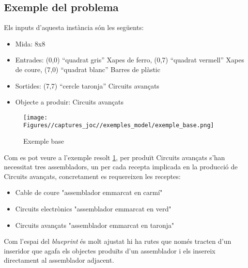 \subsection{Exemple del problema}
Els inputs d'aquesta instància són les següents:\\
\begin{itemize}
    \item Mida: 8x8
    \item Entrades: (0,0) ``quadrat gris'' Xapes de ferro, (0,7) ``quadrat vermell'' Xapes de coure, (7,0) ``quadrat blanc'' Barres de plàstic
    \item Sortides: (7,7) ``cercle taronja'' Circuits avançats
    \item Objecte a produir: Circuits avançats
\end{itemize}

\begin{figure}
    \centering
    \texttt{[image: Figures//captures\_joc//exemples\_model/exemple\_base.png]}
    \caption{Exemple base}
    \label{fig:solucio_exemple}
\end{figure}

Com es pot veure a l'exemple resolt \ref{fig:solucio_exemple}, per produït Circuits avançats s'han necessitat tres assembladors, un per cada recepta implicada en la producció de Circuits avançats, concretament es requereixen les receptes:
\begin{itemize}
    \item Cable de coure "assemblador emmarcat en carmí"
    \item Circuits electrònics "assemblador emmarcat en verd"
    \item Circuits avançats "assemblador emmarcat en taronja"
\end{itemize}


Com l'espai del \textit{blueprint} és molt ajustat hi ha rutes que només tracten d'un inseridor que agafa els objectes produïts d'un assemblador i els insereix directament al assemblador adjacent.\\

